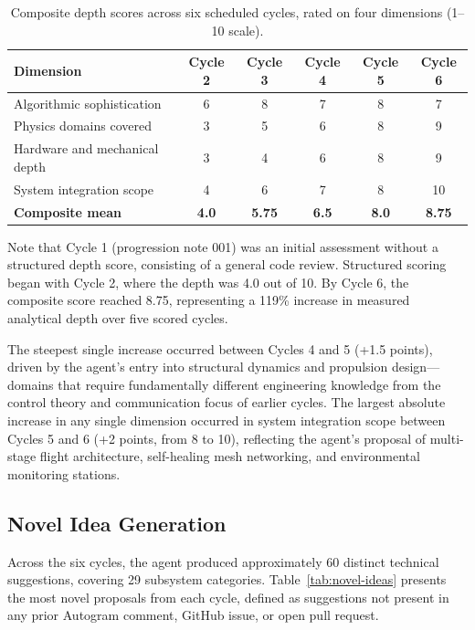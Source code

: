 \documentclass[11pt,letterpaper]{article}
\begin{document}
\begin{table}[htbp]
\centering
\caption{Composite depth scores across six scheduled cycles, rated on four dimensions (1--10 scale).}
\label{tab:depth-scores}
\begin{tabular}{lccccc}
\toprule
\textbf{Dimension} & \textbf{Cycle 2} & \textbf{Cycle 3} & \textbf{Cycle 4} & \textbf{Cycle 5} & \textbf{Cycle 6} \\
\midrule
Algorithmic sophistication & 6 & 8 & 7 & 8 & 7 \\
Physics domains covered & 3 & 5 & 6 & 8 & 9 \\
Hardware and mechanical depth & 3 & 4 & 6 & 8 & 9 \\
System integration scope & 4 & 6 & 7 & 8 & 10 \\
\midrule
\textbf{Composite mean} & \textbf{4.0} & \textbf{5.75} & \textbf{6.5} & \textbf{8.0} & \textbf{8.75} \\
\bottomrule
\end{tabular}
\end{table}

Note that Cycle 1 (progression note 001) was an initial assessment without a structured depth score, consisting of a general code review. Structured scoring began with Cycle 2, where the depth was 4.0 out of 10. By Cycle 6, the composite score reached 8.75, representing a 119\% increase in measured analytical depth over five scored cycles.

The steepest single increase occurred between Cycles 4 and 5 (+1.5 points), driven by the agent's entry into structural dynamics and propulsion design---domains that require fundamentally different engineering knowledge from the control theory and communication focus of earlier cycles. The largest absolute increase in any single dimension occurred in system integration scope between Cycles 5 and 6 (+2 points, from 8 to 10), reflecting the agent's proposal of multi-stage flight architecture, self-healing mesh networking, and environmental monitoring stations.

\subsection{Novel Idea Generation}

Across the six cycles, the agent produced approximately 60 distinct technical suggestions, covering 29 subsystem categories. Table~\ref{tab:novel-ideas} presents the most novel proposals from each cycle, defined as suggestions not present in any prior Autogram comment, GitHub issue, or open pull request.
\end{document}
